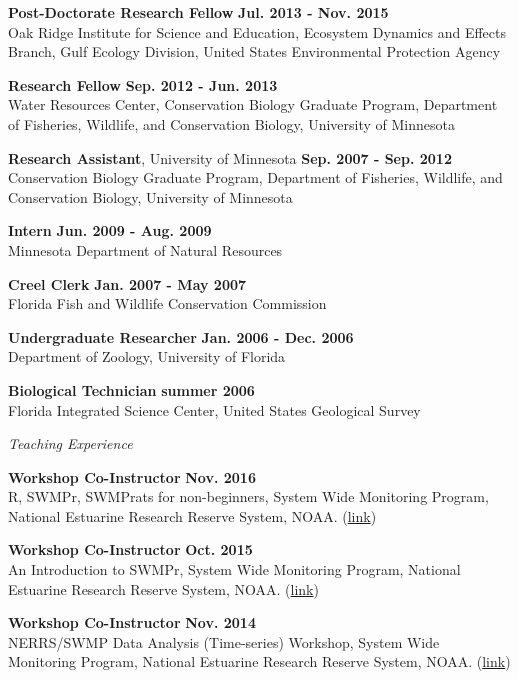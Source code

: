 \documentclass[letterpaper,12pt]{article}
\newcommand{\sectitle}[1]{\vspace{\baselineskip} \centerline{\large{\textit{#1}}}}
\begin{document}
{\bf Post-Doctorate Research Fellow} \hfill {\bf Jul. 2013 - Nov. 2015}\\
Oak Ridge Institute for Science and Education, Ecosystem Dynamics and Effects Branch, Gulf Ecology Division, United States Environmental Protection Agency

{\bf Research Fellow} \hfill {\bf Sep. 2012 - Jun. 2013} \\
Water Resources Center, Conservation Biology Graduate Program, Department of Fisheries, Wildlife, and Conservation Biology, University of Minnesota

{\bf Research Assistant}, University of Minnesota \hfill {\bf Sep. 2007 - Sep. 2012} \\
Conservation Biology Graduate Program, Department of Fisheries, Wildlife, and Conservation Biology, University of Minnesota

{\bf Intern} \hfill {\bf Jun. 2009 - Aug. 2009} \\
Minnesota Department of Natural Resources

{\bf Creel Clerk} \hfill {\bf Jan. 2007 - May 2007} \\
Florida Fish and Wildlife Conservation Commission

{\bf Undergraduate Researcher} \hfill {\bf Jan. 2006 - Dec. 2006} \\
Department of Zoology, University of Florida

{\bf Biological Technician} \hfill {\bf summer 2006} \\
Florida Integrated Science Center, United States Geological Survey

\sectitle{Teaching Experience}

{\bf Workshop Co-Instructor} \hfill {\bf Nov. 2016}\\
R, SWMPr, SWMPrats for non-beginners, System Wide Monitoring Program, National Estuarine Research Reserve System, NOAA. (\href{http://swmprats.net/2016-workshop}{link})

{\bf Workshop Co-Instructor} \hfill {\bf Oct. 2015}\\
An Introduction to SWMPr, System Wide Monitoring Program, National Estuarine Research Reserve System, NOAA. (\href{http://swmprats.net/workshop-2015}{link})

{\bf Workshop Co-Instructor} \hfill {\bf Nov. 2014}\\
NERRS/SWMP Data Analysis (Time-series) Workshop, System Wide Monitoring Program, National Estuarine Research Reserve System, NOAA. (\href{http://copepod.org/nerrs-swmp-workshop/}{link})
\end{document}
